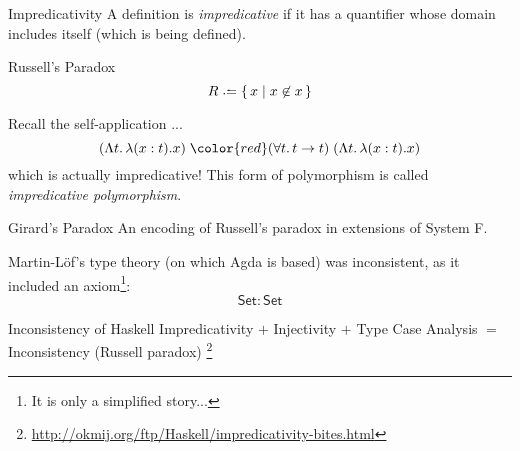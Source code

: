 \begin{frame}[allowframebreaks]{Impredicativity}
  A definition is \alert{\emph{impredicative}} if it has a quantifier whose
  domain includes itself (which is being defined). 
  \begin{block}{Russell's Paradox}
    \[
      R \defeq \set{x}{ x \not\in x }
    \]
  \end{block}
  Recall the self-application ...
  \[
    (\Lambda t.\,\lambda (x: t). x)\;{\color{red}(\forall t.\,t \to t)}\;
    (\Lambda t.\, \lambda (x: t). x) 
  \]
  which is actually impredicative! 
  This form of polymorphism is called \alert{\emph{impredicative polymorphism}}. 
  \begin{block}{Girard's Paradox}
    An encoding of Russell's paradox in extensions of
    System F. 
  \end{block}

  Martin-L\"of's type theory (on which Agda is based) was inconsistent, as it
  included an axiom\footnote{It is only a simplified story...}:
  \[
    \mathsf{Set} : \mathsf{Set}
  \]

  \begin{block}{Inconsistency of Haskell}
    Impredicativity $+$ Injectivity $+$ Type Case Analysis
    $=$ Inconsistency (Russell paradox)
    \footnote{\url{http://okmij.org/ftp/Haskell/impredicativity-bites.html}}
    
  \end{block}
\end{frame}
%
%
